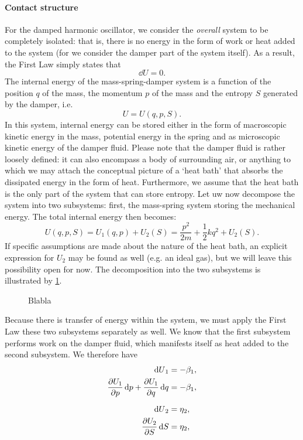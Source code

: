 \paragraph{Contact structure} For the damped harmonic oscillator, we consider the \emph{overall} system to be completely isolated: that is, there is no energy in the form of work or heat added to the system (for we consider the damper part of the system itself). As a result, the First Law simply states that
$$ \dd{U} = 0. $$
The internal energy of the mass-spring-damper system is a function of the position $q$ of the mass, the momentum $p$ of the mass and the entropy $S$ generated by the damper, i.e.
$$ U = U(q, p, S). $$
In this system, internal energy can be stored either in the form of macroscopic kinetic energy in the mass, potential energy in the spring and as microscopic kinetic energy of the damper fluid. Please note that the damper fluid is rather loosely defined: it can also encompass a body of surrounding air, or anything to which we may attach the conceptual picture of a `heat bath' that absorbs the dissipated energy in the form of heat. Furthermore, we assume that the heat bath is the only part of the system that can store entropy. Let uw now decompose the system into two subsystems: first, the mass-spring system storing the mechanical energy. 
The total internal energy then becomes:
$$ U(q, p, S) = U_1(q, p) + U_2(S) = \frac{p^2}{2m} + \frac{1}{2}kq^2 + U_2(S). $$
If specific assumptions are made about the nature of the heat bath, an explicit expression for $U_2$ may be found as well (e.g. an ideal gas), but we will leave this possibility open for now. The decomposition into the two subsystems is illustrated by \cref{fig:oscillator_thermo}.
\begin{figure}[ht!]
    \centering
    
    \caption{Blabla}
    \label{fig:oscillator_thermo}
\end{figure}
Because there is transfer of energy within the system, we must apply the First Law these two subsystems separately as well. We know that the first subsystem performs work on the damper fluid, which manifests itself as heat added to the second subsystem. We therefore have
\begin{equation}
    \begin{split}
        \dd{U}_1 &= -\beta_1, \\
        \pdv{U_1}{p}\dd{p} + \pdv{U_1}{q}\dd{q} &= -\beta_1, \\[0.2cm]
        \dd{U}_2 &= \eta_2, \\
        \pdv{U_2}{S}\dd{S} &= \eta_2, \\
    \end{split}
\end{equation}
